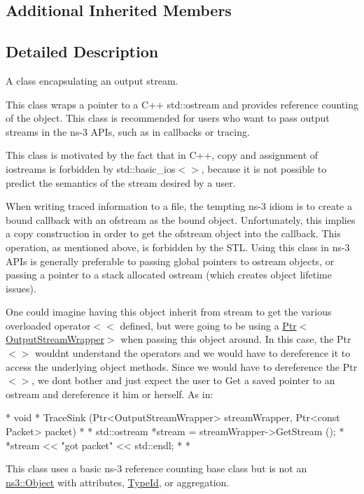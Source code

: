\subsection*{Additional Inherited Members}


\subsection{Detailed Description}
A class encapsulating an output stream. 

This class wraps a pointer to a C++ std\+::ostream and provides reference counting of the object. This class is recommended for users who want to pass output streams in the ns-\/3 A\+P\+Is, such as in callbacks or tracing.

This class is motivated by the fact that in C++, copy and assignment of iostreams is forbidden by std\+::basic\+\_\+ios$<$$>$, because it is not possible to predict the semantics of the stream desired by a user.

When writing traced information to a file, the tempting ns-\/3 idiom is to create a bound callback with an ofstream as the bound object. Unfortunately, this implies a copy construction in order to get the ofstream object into the callback. This operation, as mentioned above, is forbidden by the S\+TL. Using this class in ns-\/3 A\+P\+Is is generally preferable to passing global pointers to ostream objects, or passing a pointer to a stack allocated ostream (which creates object lifetime issues).

One could imagine having this object inherit from stream to get the various overloaded operator$<$$<$ defined, but we\textquotesingle{}re going to be using a \hyperlink{classns3_1_1Ptr}{Ptr$<$\+Output\+Stream\+Wrapper$>$} when passing this object around. In this case, the Ptr$<$$>$ wouldn\textquotesingle{}t understand the operators and we would have to dereference it to access the underlying object methods. Since we would have to dereference the Ptr$<$$>$, we don\textquotesingle{}t bother and just expect the user to Get a saved pointer to an ostream and dereference it him or herself. As in\+:

\begin{DoxyVerb}*   void 
*   TraceSink (Ptr<OutputStreamWrapper> streamWrapper, Ptr<const Packet> packet)
*   {
*     std::ostream *stream = streamWrapper->GetStream ();
*     *stream << "got packet" << std::endl;
*   }
* \end{DoxyVerb}


This class uses a basic ns-\/3 reference counting base class but is not an \hyperlink{classns3_1_1Object}{ns3\+::\+Object} with attributes, \hyperlink{classns3_1_1TypeId}{Type\+Id}, or aggregation. 

